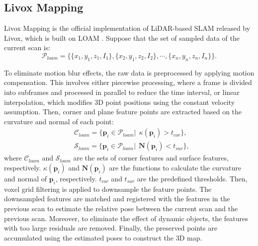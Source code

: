 \subsection{Livox Mapping}
Livox Mapping \cite{sdk} is the official implementation of LiDAR-based SLAM released by Livox, which is built on LOAM \cite{loam}. Suppose that the set of sampled data of the current scan is:
\begin{equation}
\mathcal{P}_{loam} = \{ \{x_{1},y_{1},z_{1},I_{1}\}, \{x_{2},y_{1},z_{2},I_{2}\}, \cdots, \{x_{n},y_{n},z_{n},I_{n}\} \}. \label{loamdata}
\end{equation} \par
To eliminate motion blur effects, the raw data is preprocessed by applying motion compensation. This involves either piecewise processing, where a frame is divided into subframes and processed in parallel to reduce the time interval, or linear interpolation, which modifies 3D point positions using the constant velocity assumption. Then, corner and plane feature points are extracted based on the curvature and normal of each point:
\begin{equation}
\begin{aligned}
&\mathcal{C}_{loam} = \{ \mathbf{p}_{i} \in \mathcal{P}_{loam} | \ \ \kappa(\mathbf{p}_{i})> t_{cor} \}, \\
&\mathcal{S}_{loam} = \{ \mathbf{p}_{i} \in \mathcal{P}_{loam} | \ \ \mathbf{N}(\mathbf{p}_{i})< t_{sur} \},
\end{aligned}
\end{equation} 
where $\mathcal{C}_{loam}$ and $\mathcal{S}_{loam}$ are the sets of corner features and surface features, respectively. $\kappa(\mathbf{p}_{i})$ and $\mathbf{N}(\mathbf{p}_{i})$ are the functions to calculate the curvature and normal of $\mathbf{p}_{i}$, respectively. $t_{cor}$ and $t_{sur}$ are the predefined thresholds. Then, voxel grid filtering is applied to downsample the feature points. The downsampled features are matched and registered with the features in the previous scan to estimate the relative pose between the current scan and the previous scan. Moreover, to eliminate the effect of dynamic objects, the features with too large residuals are removed. Finally, the preserved points are accumulated using the estimated poses to construct the 3D map.
